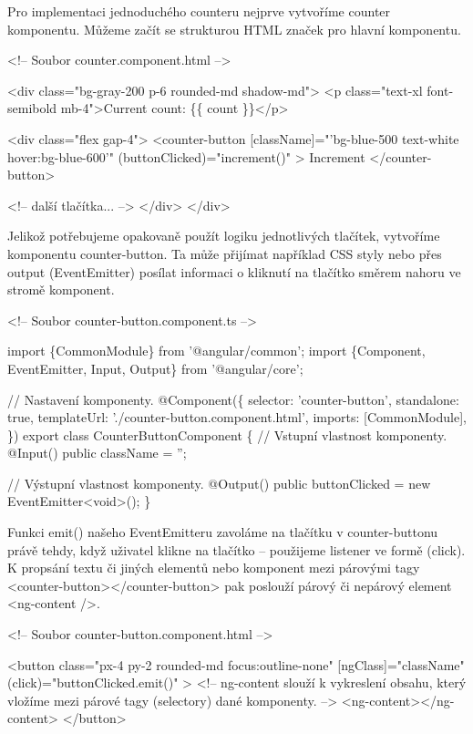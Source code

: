 Pro implementaci jednoduchého counteru nejprve vytvoříme counter komponentu. Můžeme začít se strukturou HTML značek pro hlavní komponentu.

\begin{prog}
<!-- Soubor counter.component.html -->

<div class="bg-gray-200 p-6 rounded-md shadow-md">
  <p class="text-xl font-semibold mb-4">Current count: \{\{ count \}\}</p>

  <div class="flex gap-4">
    <counter-button
      [className]="'bg-blue-500 text-white hover:bg-blue-600'"
      (buttonClicked)="increment()"
    >
      Increment
    </counter-button>

    <!-- další tlačítka... -->
  </div>
</div>
\end{prog}

Jelikož potřebujeme opakovaně použít logiku jednotlivých tlačítek, vytvoříme komponentu counter-button. 
Ta může přijímat například CSS styly nebo přes output (EventEmitter) posílat informaci o kliknutí na tlačítko směrem nahoru ve stromě komponent.

\begin{prog}
<!-- Soubor counter-button.component.ts -->

import \{CommonModule\} from '@angular/common';
import \{Component, EventEmitter, Input, Output\} from '@angular/core';

// Nastavení komponenty.
@Component(\{
  selector: 'counter-button',
  standalone: true,
  templateUrl: './counter-button.component.html',
  imports: [CommonModule],
\})
export class CounterButtonComponent \{
  // Vstupní vlastnost komponenty.
  @Input() public className = '';

  // Výstupní vlastnost komponenty.
  @Output() public buttonClicked = new EventEmitter<void>();
\}
\end{prog}

Funkci emit() našeho EventEmitteru zavoláme na tlačítku v counter-buttonu právě tehdy, když uživatel klikne na tlačítko -- použijeme listener ve formě (click). 
K propsání textu či jiných elementů nebo komponent mezi párovými tagy <counter-button></counter-button> pak poslouží párový či nepárový element <ng-content />.

\begin{prog}
<!-- Soubor counter-button.component.html -->

<button
  class="px-4 py-2 rounded-md focus:outline-none"
  [ngClass]="className"
  (click)="buttonClicked.emit()"
>
  <!-- ng-content slouží k vykreslení obsahu, který vložíme
   mezi párové tagy (selectory) dané komponenty. -->
  <ng-content></ng-content>
</button>
\end{prog}

